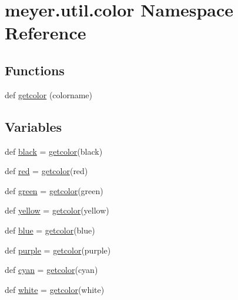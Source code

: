 \hypertarget{namespacemeyer_1_1util_1_1color}{}\section{meyer.\+util.\+color Namespace Reference}
\label{namespacemeyer_1_1util_1_1color}
\subsection*{Functions}
\begin{DoxyCompactItemize}
\item 
def \hyperlink{namespacemeyer_1_1util_1_1color_a777b068ba3d7bb397cb83871d691ecf5}{getcolor} (colorname)
\end{DoxyCompactItemize}
\subsection*{Variables}
\begin{DoxyCompactItemize}
\item 
def \hyperlink{namespacemeyer_1_1util_1_1color_ada7454f7b48544c229ea2a3ae9f633ce}{black} = \hyperlink{namespacemeyer_1_1util_1_1color_a777b068ba3d7bb397cb83871d691ecf5}{getcolor}(\textquotesingle{}black\textquotesingle{})
\item 
def \hyperlink{namespacemeyer_1_1util_1_1color_a73b6737d01fe2c13bcb4b9ce85929329}{red} = \hyperlink{namespacemeyer_1_1util_1_1color_a777b068ba3d7bb397cb83871d691ecf5}{getcolor}(\textquotesingle{}red\textquotesingle{})
\item 
def \hyperlink{namespacemeyer_1_1util_1_1color_a408ce5a7a281f56a95ee22c3b30917ce}{green} = \hyperlink{namespacemeyer_1_1util_1_1color_a777b068ba3d7bb397cb83871d691ecf5}{getcolor}(\textquotesingle{}green\textquotesingle{})
\item 
def \hyperlink{namespacemeyer_1_1util_1_1color_ac0f324d815814186c496b02c58e20a61}{yellow} = \hyperlink{namespacemeyer_1_1util_1_1color_a777b068ba3d7bb397cb83871d691ecf5}{getcolor}(\textquotesingle{}yellow\textquotesingle{})
\item 
def \hyperlink{namespacemeyer_1_1util_1_1color_a1c7941d82b45afd60754e5974263b99d}{blue} = \hyperlink{namespacemeyer_1_1util_1_1color_a777b068ba3d7bb397cb83871d691ecf5}{getcolor}(\textquotesingle{}blue\textquotesingle{})
\item 
def \hyperlink{namespacemeyer_1_1util_1_1color_acb70a71abf2319da1f0086bc3c7c4315}{purple} = \hyperlink{namespacemeyer_1_1util_1_1color_a777b068ba3d7bb397cb83871d691ecf5}{getcolor}(\textquotesingle{}purple\textquotesingle{})
\item 
def \hyperlink{namespacemeyer_1_1util_1_1color_a6da67b9f01da86ac24097fa7e978526e}{cyan} = \hyperlink{namespacemeyer_1_1util_1_1color_a777b068ba3d7bb397cb83871d691ecf5}{getcolor}(\textquotesingle{}cyan\textquotesingle{})
\item 
def \hyperlink{namespacemeyer_1_1util_1_1color_a54c3aa0aab3ccea89e2b6928b4e23d6d}{white} = \hyperlink{namespacemeyer_1_1util_1_1color_a777b068ba3d7bb397cb83871d691ecf5}{getcolor}(\textquotesingle{}white\textquotesingle{})
\end{DoxyCompactItemize}


